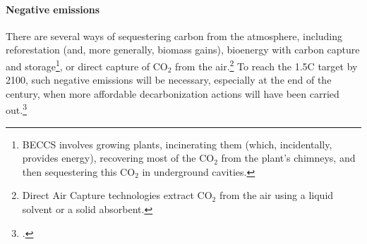 \documentclass[a5paper,english,openany]{memoir}
\begin{document}
\paragraph{Negative emissions}
There are several ways of sequestering carbon from the atmosphere, including reforestation (and, more generally, biomass gains), bioenergy with carbon capture and storage\footnote{BECCS involves growing plants, incinerating them (which, incidentally, provides energy), recovering most of the CO$_\text{2}$ from the plant's chimneys, and then sequestering this CO$_\text{2}$ in underground cavities.}, or direct capture of CO$_\text{2}$ from the air.\footnote{Direct Air Capture technologies extract CO$_\text{2}$ from the air using a liquid solvent or a solid absorbent.} 
To reach the 1.5\textdegree{}C target by 2100, such negative emissions will be necessary, especially at the end of the century, when more affordable decarbonization actions will have been carried out.\footnote{\citet{minx_negative_2018}.} 
\end{document}
